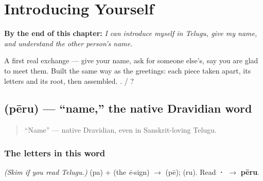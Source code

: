 
\chapter{Introducing Yourself}
\label{ch:introductions}

\begin{chapteropening}
\textbf{By the end of this chapter:} \emph{I can introduce myself in Telugu, give my name, and understand the other person's name.}

A first real exchange — give your name, ask for someone else's, say you are glad to meet them. Built the same way as the greetings: each piece taken apart, its letters and its root, then assembled.   . /   ?
\end{chapteropening}

\section[\texorpdfstring{\te{పేరు} (pēru)}{పేరు (pēru)}]{ (pēru) — \textquotedblleft{}name,\textquotedblright{} the native Dravidian word}

\label{lesson:TE-C02-peru}



\begin{quote}
\textquotedblleft{}Name\textquotedblright{} — native Dravidian, even in Sanskrit-loving Telugu.
\end{quote}

\subsection*{The letters in this word}
\emph{(Skim if you read Telugu.)} \textbf{} (pa) + \textbf{} (the \emph{ē}-sign) $\to$ \textbf{} (pē); \textbf{} (ru). Read \textbf{·} $\to$ \textbf{pēru}.


